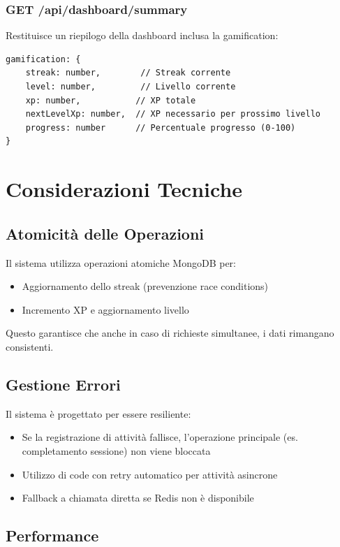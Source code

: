 \documentclass[11pt,a4paper]{article}
\begin{document}
\subsubsection{GET /api/dashboard/summary}

Restituisce un riepilogo della dashboard inclusa la gamification:

\begin{lstlisting}
gamification: {
    streak: number,        // Streak corrente
    level: number,         // Livello corrente
    xp: number,           // XP totale
    nextLevelXp: number,  // XP necessario per prossimo livello
    progress: number      // Percentuale progresso (0-100)
}
\end{lstlisting}

\section{Considerazioni Tecniche}

\subsection{Atomicità delle Operazioni}

Il sistema utilizza operazioni atomiche MongoDB per:
\begin{itemize}
    \item Aggiornamento dello streak (prevenzione race conditions)
    \item Incremento XP e aggiornamento livello
\end{itemize}

Questo garantisce che anche in caso di richieste simultanee, i dati rimangano consistenti.

\subsection{Gestione Errori}

Il sistema è progettato per essere resiliente:
\begin{itemize}
    \item Se la registrazione di attività fallisce, l'operazione principale (es. completamento sessione) non viene bloccata
    \item Utilizzo di code con retry automatico per attività asincrone
    \item Fallback a chiamata diretta se Redis non è disponibile
\end{itemize}

\subsection{Performance}
\end{document}
